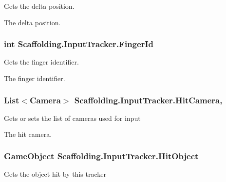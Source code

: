 Gets the delta position. 

The delta position.\hypertarget{class_scaffolding_1_1_input_tracker_a53596ca80977b53a7d9c1931e0defaa4}{
\subsubsection[{Finger\+Id}]{\setlength{\rightskip}{0pt plus 5cm}int Scaffolding.\+Input\+Tracker.\+Finger\+Id\hspace{0.3cm}{\ttfamily [get]}}}\label{class_scaffolding_1_1_input_tracker_a53596ca80977b53a7d9c1931e0defaa4}


Gets the finger identifier. 

The finger identifier.\hypertarget{class_scaffolding_1_1_input_tracker_a8b3f5b027dc3d7d325cffa4df0633dcf}{
\subsubsection[{Hit\+Camera}]{\setlength{\rightskip}{0pt plus 5cm}List$<$Camera$>$ Scaffolding.\+Input\+Tracker.\+Hit\+Camera\hspace{0.3cm}{\ttfamily [get]}, {\ttfamily [set]}}}\label{class_scaffolding_1_1_input_tracker_a8b3f5b027dc3d7d325cffa4df0633dcf}


Gets or sets the list of cameras used for input 

The hit camera.\hypertarget{class_scaffolding_1_1_input_tracker_a6c539c6f8ad29e71d9426cb75194082f}{
\subsubsection[{Hit\+Object}]{\setlength{\rightskip}{0pt plus 5cm}Game\+Object Scaffolding.\+Input\+Tracker.\+Hit\+Object\hspace{0.3cm}{\ttfamily [get]}}}\label{class_scaffolding_1_1_input_tracker_a6c539c6f8ad29e71d9426cb75194082f}


Gets the object hit by this tracker 

